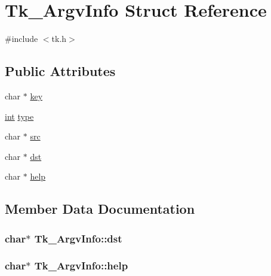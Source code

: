 \hypertarget{struct_tk___argv_info}{}\section{Tk\+\_\+\+Argv\+Info Struct Reference}
\label{struct_tk___argv_info}


{\ttfamily \#include $<$tk.\+h$>$}

\subsection*{Public Attributes}
\begin{DoxyCompactItemize}
\item 
char $\ast$ \hyperlink{struct_tk___argv_info_a22bb0557bd6b65aca1eb686371c38561}{key}
\item 
\hyperlink{tk_8h_a83f82f76e7fed06f4c49d2db94028a6d}{int} \hyperlink{struct_tk___argv_info_a24a7807435bbaa0e4a92c9508b7626e8}{type}
\item 
char $\ast$ \hyperlink{struct_tk___argv_info_af76b30767502e5e5009c4f9e813df831}{src}
\item 
char $\ast$ \hyperlink{struct_tk___argv_info_a02e17f3d3f8bfa6f0d941e659236a7d2}{dst}
\item 
char $\ast$ \hyperlink{struct_tk___argv_info_a2b1f109586e813d96307e5a3d686de3a}{help}
\end{DoxyCompactItemize}


\subsection{Member Data Documentation}
\subsubsection[{\texorpdfstring{dst}{dst}}]{\setlength{\rightskip}{0pt plus 5cm}char$\ast$ Tk\+\_\+\+Argv\+Info\+::dst}\hypertarget{struct_tk___argv_info_a02e17f3d3f8bfa6f0d941e659236a7d2}{}\label{struct_tk___argv_info_a02e17f3d3f8bfa6f0d941e659236a7d2}
\subsubsection[{\texorpdfstring{help}{help}}]{\setlength{\rightskip}{0pt plus 5cm}char$\ast$ Tk\+\_\+\+Argv\+Info\+::help}\hypertarget{struct_tk___argv_info_a2b1f109586e813d96307e5a3d686de3a}{}\label{struct_tk___argv_info_a2b1f109586e813d96307e5a3d686de3a}
